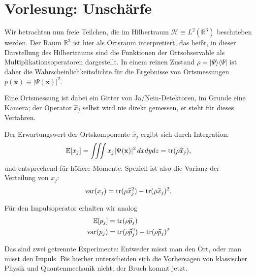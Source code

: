 \section{Vorlesung: Unschärfe}
Wir betrachten nun freie Teilchen, die im Hilbertraum $\mathcal{H}\equiv L^2(\mathbb{R}^3)$ beschrieben werden. Der Raum $\mathbb{R}^3$ ist hier als Ortsraum interpretiert, das heißt, in dieser Darstellung des Hilbertraums sind die Funktionen der Ortsobservable als Multiplikationsoperatoren dargestellt. In einem reinen Zustand $\rho = |\Psi\rangle\langle \Psi|$ ist daher die Wahrscheinlichkeitsdichte für die Ergebnisse von Ortsmessungen $p(\mathbf{x})\equiv |\Psi(\mathbf{x})|^2$.

Eine Ortsmessung ist dabei ein Gitter von Ja/Nein-Detektoren, im Grunde eine Kamera; der Operator $\widehat{x}_j$ selbst wird nie direkt gemessen, er steht für dieses Verfahren.

Der Erwartungswert der Ortskomponente $\widehat{x}_j$ ergibt sich durch Integration:
\begin{equation}
	\mathbb{E}[x_j] = \iiint x_j |\Psi(\mathbf{x})|^2\, dxdydz = \operatorname{tr}(\rho \widehat{x}_j),
\end{equation}
und entsprechend für höhere Momente. Speziell ist also die Varianz der Verteilung von $x_j$:
\begin{equation}
	\text{var}(x_j) = \operatorname{tr}(\rho \widehat{x}_j^2) - \operatorname{tr}(\rho \widehat{x}_j)^2.
\end{equation}

Für den Impulsoperator erhalten wir analog
\begin{align}
	\mathbb{E}[p_j] &= \operatorname{tr}(\rho \widehat{p}_j) \\
	\text{var}(p_j) &= \operatorname{tr}(\rho \widehat{p}_j^2) - \operatorname{tr}(\rho \widehat{p}_j)^2
\end{align}

Das sind zwei getrennte Experimente: Entweder misst man den Ort, oder man misst den Impuls. Bis hierher unterscheiden sich die Vorhersagen von klassischer Physik und Quantenmechanik nicht; der Bruch kommt jetzt.


